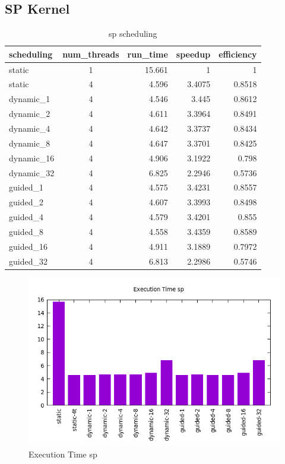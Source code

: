 \documentclass[12pt]{article}
\begin{document}
\newpage

\subsection*{SP Kernel}

\begin{table}[h!]
	\centering
	\begin{tabular}{|l|c|r|r|r|}
		\hline
		scheduling & num\_threads & run\_time & speedup & efficiency \\
		\hline
		\hline
		static & 1 & 15.661 & 1 & 1 \\
		\hline
		static & 4 & 4.596 & 3.4075 & 0.8518 \\
		\hline
		dynamic\_1 & 4 & 4.546 & 3.445 & 0.8612 \\
		\hline
		dynamic\_2 & 4 & 4.611 & 3.3964 & 0.8491 \\
		\hline
		dynamic\_4 & 4 & 4.642 & 3.3737 & 0.8434 \\
		\hline
		dynamic\_8 & 4 & 4.647 & 3.3701 & 0.8425 \\
		\hline
		dynamic\_16 & 4 & 4.906 & 3.1922 & 0.798 \\
		\hline
		dynamic\_32 & 4 & 6.825 & 2.2946 & 0.5736 \\
		\hline
		guided\_1 & 4 & 4.575 & 3.4231 & 0.8557 \\
		\hline
		guided\_2 & 4 & 4.607 & 3.3993 & 0.8498 \\
		\hline
		guided\_4 & 4 & 4.579 & 3.4201 & 0.855 \\
		\hline
		guided\_8 & 4 & 4.558 & 3.4359 & 0.8589 \\
		\hline
		guided\_16 & 4 & 4.911 & 3.1889 & 0.7972 \\
		\hline
		guided\_32 & 4 & 6.813 & 2.2986 & 0.5746 \\
		\hline
	\end{tabular}
	\caption{sp scheduling}
\label{tab:chunksp}
\end{table}

\begin{figure}[h!]
	\centering
	\includegraphics[width=0.7\linewidth]{sp_scheduling_t.png}
	\caption{Execution Time sp}
	\label{fig:tksp}
\end{figure}
\end{document}
